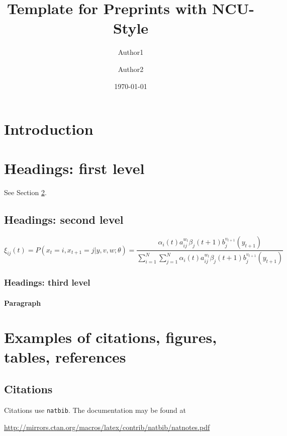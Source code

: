 \documentclass[table,dvipsnames]{ncu}   %
\title{Template for Preprints with NCU-Style}
\author[1]{Author1}
\author[2]{Author2}
\affiliation[1]{Affiliation}
\affiliation[2]{Affiliation}
\date{\today}
\theoremstyle{plain}
\theoremstyle{definition}
\theoremstyle{remark}
\begin{document}
\maketitle

\section{Introduction}
\lipsum[2]
\lipsum[3]

\section{Headings: first level}
\label{sec:headings}

\lipsum[4] See Section \ref{sec:headings}.

\subsection{Headings: second level}
\lipsum[5]
\begin{equation}
	\xi _{ij}(t)=P(x_{t}=i,x_{t+1}=j|y,v,w;\theta)= {\frac {\alpha _{i}(t)a^{w_t}_{ij}\beta _{j}(t+1)b^{v_{t+1}}_{j}(y_{t+1})}{\sum _{i=1}^{N} \sum _{j=1}^{N} \alpha _{i}(t)a^{w_t}_{ij}\beta _{j}(t+1)b^{v_{t+1}}_{j}(y_{t+1})}}
\end{equation}

\subsubsection{Headings: third level}
\lipsum[6]

\paragraph{Paragraph}
\lipsum[7]

\section{Examples of citations, figures, tables, references}
\label{sec:others}

\subsection{Citations}
Citations use \verb+natbib+. The documentation may be found at
\begin{center}
	\url{http://mirrors.ctan.org/macros/latex/contrib/natbib/natnotes.pdf}
\end{center}
\end{document}
